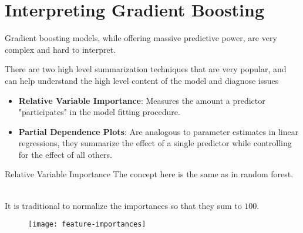 \section{Interpreting Gradient Boosting}

\begin{frame}
Gradient boosting models, while offering massive predictive power, are very complex and hard to interpret.
\end{frame}
%
\begin{frame}
There are two high level summarization techniques that are very popular, and can help understand the high level content of the model and diagnose issues

\begin{itemize}
  \item \textbf{Relative Variable Importance}: Measures the amount a predictor "participates" in the model fitting procedure.
  \item \textbf{Partial Dependence Plots}: Are analogous to parameter estimates in linear regressions, they summarize the effect of a single predictor while controlling for the effect of all others.
\end{itemize}
\end{frame}
%
\begin{frame}{Relative Variable Importance}
The concept here is the same as in random forest.\\~\\




\end{frame}
%
\begin{frame}
It is traditional to normalize the importances so that they sum to $100$.

  \begin{figure}
    \texttt{[image: feature-importances]}
  \end{figure}
  
\end{frame}
